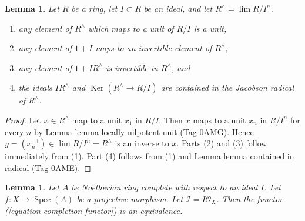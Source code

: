 \documentclass{amsart}
\theoremstyle{plain}
\newtheorem{lemma}[subsection]{Lemma}
\theoremstyle{definition}
\theoremstyle{remark}
\numberwithin{equation}{subsection}
\def\lim{\mathop{\mathrm{lim}}\nolimits}
\def\Spec{\mathop{\mathrm{Spec}}}
\def\Ker{\mathop{\mathrm{Ker}}}
\begin{document}
\begin{lemma}
\label{algebra-lemma-radical-completion}
Let $R$ be a ring, let $I \subset R$ be an ideal, and let
$R^\wedge = \lim R/I^n$.
\begin{enumerate}
\item any element of $R^\wedge$ which maps to a unit of $R/I$ is a unit,
\item any element of $1 + I$ maps to an invertible element of $R^\wedge$,
\item any element of $1 + IR^\wedge$ is invertible in $R^\wedge$, and
\item the ideals $IR^\wedge$ and $\Ker(R^\wedge \to R/I)$ are contained
in the Jacobson radical of $R^\wedge$.
\end{enumerate}
\end{lemma}

\begin{proof}
Let $x \in R^\wedge$ map to a unit $x_1$ in $R/I$.
Then $x$ maps to a unit $x_n$ in $R/I^n$ for every $n$ by
Lemma \href{https://stacks.math.columbia.edu/tag/0AMG}{lemma locally nilpotent unit (Tag 0AMG)}.
Hence $y = (x_n^{-1}) \in \lim R/I^n = R^\wedge$ is an inverse to $x$.
Parts (2) and (3) follow immediately from (1).
Part (4) follows from (1) and Lemma \href{https://stacks.math.columbia.edu/tag/0AME}{lemma contained in radical (Tag 0AME)}.
\end{proof}


\begin{lemma}
\label{lemma-existence-projective}
Let $A$ be Noetherian ring complete with respect to an ideal $I$.
Let $f : X \to \Spec(A)$ be a projective morphism. Let
$\mathcal{I} = I\mathcal{O}_X$.
Then the functor (\ref{equation-completion-functor}) is an equivalence.
\end{lemma}
\end{document}
